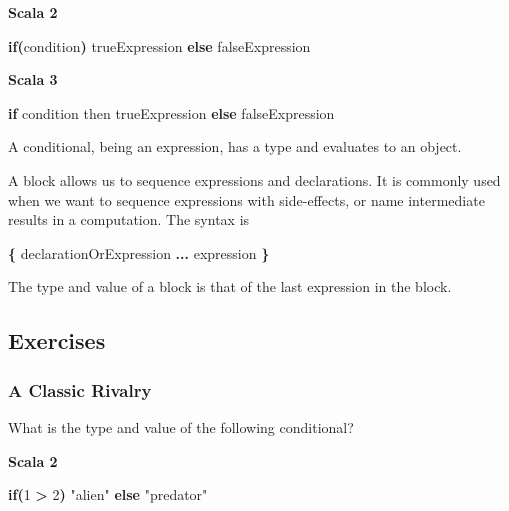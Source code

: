 \documentclass[11pt,a5paper,]{book}
\newenvironment{Shaded}{\begin{snugshade}}{\end{snugshade}}
\newcommand{\ControlFlowTok}[1]{\textcolor[rgb]{0.13,0.29,0.53}{\textbf{#1}}}
\newcommand{\DecValTok}[1]{\textcolor[rgb]{0.00,0.00,0.81}{#1}}
\newcommand{\NormalTok}[1]{#1}
\newcommand{\OperatorTok}[1]{\textcolor[rgb]{0.81,0.36,0.00}{\textbf{#1}}}
\newcommand{\StringTok}[1]{\textcolor[rgb]{0.31,0.60,0.02}{#1}}
\begin{document}
\textbf{Scala 2}

\begin{Shaded}
\begin{Highlighting}[]
\ControlFlowTok{if}\OperatorTok{(}\NormalTok{condition}\OperatorTok{)}
\NormalTok{  trueExpression}
\ControlFlowTok{else}
\NormalTok{  falseExpression}
\end{Highlighting}
\end{Shaded}

\textbf{Scala 3}

\begin{Shaded}
\begin{Highlighting}[]
\ControlFlowTok{if}\NormalTok{ condition then trueExpression }\ControlFlowTok{else}\NormalTok{ falseExpression}
\end{Highlighting}
\end{Shaded}

A conditional, being an expression, has a type and evaluates to an
object.

A block allows us to sequence expressions and declarations. It is
commonly used when we want to sequence expressions with side-effects, or
name intermediate results in a computation. The syntax is

\begin{Shaded}
\begin{Highlighting}[]
\OperatorTok{\{}
\NormalTok{   declarationOrExpression }\OperatorTok{...}
\NormalTok{   expression}
\OperatorTok{\}}
\end{Highlighting}
\end{Shaded}

The type and value of a block is that of the last expression in the
block.

\hypertarget{exercises-4}{%
\subsection{Exercises}\label{exercises-4}}

\hypertarget{a-classic-rivalry}{%
\subsubsection{A Classic Rivalry}\label{a-classic-rivalry}}

What is the type and value of the following conditional?

\textbf{Scala 2}

\begin{Shaded}
\begin{Highlighting}[]
\ControlFlowTok{if}\OperatorTok{(}\DecValTok{1} \OperatorTok{\textgreater{}} \DecValTok{2}\OperatorTok{)} \StringTok{"alien"} \ControlFlowTok{else} \StringTok{"predator"}
\end{Highlighting}
\end{Shaded}
\end{document}
